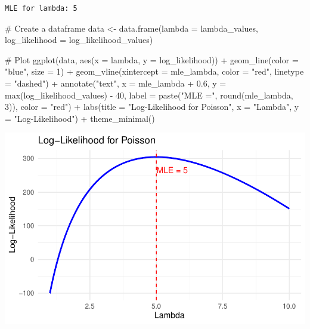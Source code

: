 \documentclass[
  letterpaper,
  DIV=11,
  numbers=noendperiod]{scrartcl}
\newenvironment{Shaded}{\begin{snugshade}}{\end{snugshade}}
\newcommand{\AttributeTok}[1]{\textcolor[rgb]{0.40,0.45,0.13}{#1}}
\newcommand{\CommentTok}[1]{\textcolor[rgb]{0.37,0.37,0.37}{#1}}
\newcommand{\DecValTok}[1]{\textcolor[rgb]{0.68,0.00,0.00}{#1}}
\newcommand{\FloatTok}[1]{\textcolor[rgb]{0.68,0.00,0.00}{#1}}
\newcommand{\FunctionTok}[1]{\textcolor[rgb]{0.28,0.35,0.67}{#1}}
\newcommand{\NormalTok}[1]{\textcolor[rgb]{0.00,0.23,0.31}{#1}}
\newcommand{\OtherTok}[1]{\textcolor[rgb]{0.00,0.23,0.31}{#1}}
\newcommand{\SpecialCharTok}[1]{\textcolor[rgb]{0.37,0.37,0.37}{#1}}
\newcommand{\StringTok}[1]{\textcolor[rgb]{0.13,0.47,0.30}{#1}}
\begin{document}
\begin{verbatim}
MLE for lambda: 5 
\end{verbatim}

\begin{Shaded}
\begin{Highlighting}[]
\CommentTok{\# Create a dataframe}
\NormalTok{data }\OtherTok{\textless{}{-}} \FunctionTok{data.frame}\NormalTok{(}\AttributeTok{lambda =}\NormalTok{ lambda\_values, }\AttributeTok{log\_likelihood =}\NormalTok{ log\_likelihood\_values)}

\CommentTok{\# Plot}
\FunctionTok{ggplot}\NormalTok{(data, }\FunctionTok{aes}\NormalTok{(}\AttributeTok{x =}\NormalTok{ lambda, }\AttributeTok{y =}\NormalTok{ log\_likelihood)) }\SpecialCharTok{+}
  \FunctionTok{geom\_line}\NormalTok{(}\AttributeTok{color =} \StringTok{"blue"}\NormalTok{, }\AttributeTok{size =} \DecValTok{1}\NormalTok{) }\SpecialCharTok{+}
  \FunctionTok{geom\_vline}\NormalTok{(}\AttributeTok{xintercept =}\NormalTok{ mle\_lambda, }\AttributeTok{color =} \StringTok{"red"}\NormalTok{, }\AttributeTok{linetype =} \StringTok{"dashed"}\NormalTok{) }\SpecialCharTok{+}
  \FunctionTok{annotate}\NormalTok{(}\StringTok{"text"}\NormalTok{, }
           \AttributeTok{x =}\NormalTok{ mle\_lambda }\SpecialCharTok{+} \FloatTok{0.6}\NormalTok{, }
           \AttributeTok{y =} \FunctionTok{max}\NormalTok{(log\_likelihood\_values) }\SpecialCharTok{{-}} \DecValTok{40}\NormalTok{,}
           \AttributeTok{label =} \FunctionTok{paste}\NormalTok{(}\StringTok{"MLE ="}\NormalTok{, }\FunctionTok{round}\NormalTok{(mle\_lambda, }\DecValTok{3}\NormalTok{)), }
           \AttributeTok{color =} \StringTok{"red"}\NormalTok{) }\SpecialCharTok{+}
  \FunctionTok{labs}\NormalTok{(}\AttributeTok{title =} \StringTok{"Log{-}Likelihood for Poisson"}\NormalTok{,}
       \AttributeTok{x =} \StringTok{"Lambda"}\NormalTok{,}
       \AttributeTok{y =} \StringTok{"Log{-}Likelihood"}\NormalTok{) }\SpecialCharTok{+}
  \FunctionTok{theme\_minimal}\NormalTok{()}
\end{Highlighting}
\end{Shaded}

\includegraphics{HW3_files/figure-pdf/unnamed-chunk-4-1.pdf}
\end{document}

